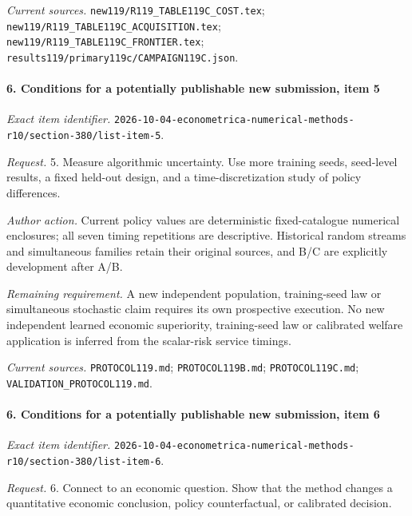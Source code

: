 \par\emph{Current sources.} \nolinkurl{new119/R119_TABLE119C_COST.tex}; \nolinkurl{new119/R119_TABLE119C_ACQUISITION.tex}; \nolinkurl{new119/R119_TABLE119C_FRONTIER.tex}; \nolinkurl{results119/primary119c/CAMPAIGN119C.json}.

\paragraph{6. Conditions for a potentially publishable new submission, item 5}

\emph{Exact item identifier.} \nolinkurl{2026-10-04-econometrica-numerical-methods-r10/section-380/list-item-5}.

\par\emph{Request.} 5. Measure algorithmic uncertainty. Use more training seeds, seed-level results, a fixed held-out design, and a time-discretization study of policy differences.

\par\emph{Author action.} Current policy values are deterministic fixed-catalogue numerical enclosures; all seven timing repetitions are descriptive. Historical random streams and simultaneous families retain their original sources, and B/\allowbreak{}C are explicitly development after A/\allowbreak{}B.

\par\emph{Remaining requirement.} A new independent population, training-seed law or simultaneous stochastic claim requires its own prospective execution. No new independent learned economic superiority, training-seed law or calibrated welfare application is inferred from the scalar-risk service timings.

\par\emph{Current sources.} \nolinkurl{PROTOCOL119.md}; \nolinkurl{PROTOCOL119B.md}; \nolinkurl{PROTOCOL119C.md}; \nolinkurl{VALIDATION_PROTOCOL119.md}.

\paragraph{6. Conditions for a potentially publishable new submission, item 6}

\emph{Exact item identifier.} \nolinkurl{2026-10-04-econometrica-numerical-methods-r10/section-380/list-item-6}.

\par\emph{Request.} 6. Connect to an economic question. Show that the method changes a quantitative economic conclusion, policy counterfactual, or calibrated decision.

